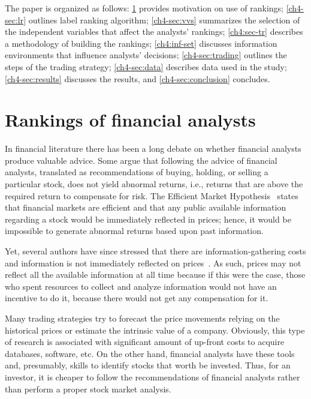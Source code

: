 \documentclass[a4paper,twoside,12pt,openright,notitlepage]{report}\usepackage[]{graphicx}\usepackage[]{color}
\begin{document}
The paper is organized as follows: \ref{ch4-sec:ranking} provides motivation on use of rankings; \ref{ch4-sec:lr} outlines label ranking algorithm; \ref{ch4-sec:vvs} summarizes the selection of the independent variables that affect the analysts' rankings; \ref{ch4:sec-tr} describes a methodology of building the rankings; \ref{ch4:inf-set} discusses information environments that influence analysts' decisions; \ref{ch4-sec:trading} outlines the steps of the trading strategy; \ref{ch4-sec:data} describes data used in the study; \ref{ch4-sec:results} discusses the results, and \ref{ch4-sec:conclusion} concludes.

\section{Rankings of financial  analysts}
\label{ch4-sec:ranking}
In  financial literature there has been a long debate on whether financial analysts produce valuable  advice. Some argue that following the advice of financial analysts,  translated as recommendations of buying, holding, or selling a particular stock, does not yield  abnormal returns, i.e.,  returns that are above the required return to compensate for risk. The Efficient Market Hypothesis~\citep{fama1970ecm} states that financial markets are efficient and that any public available information  regarding a stock would be immediately reflected in prices; hence, it would be  impossible to generate abnormal returns based upon past information.

Yet, several authors have since stressed that  there are information-gathering costs and information is not immediately reflected on prices~\citep{grossman1980iie}. As such, prices may not  reflect all the available information at all time because if this were the case, those who spent resources to collect and analyze   information would not have an incentive to do it, because there would not get any compensation for it.

Many trading strategies try to forecast the price movements relying on the historical prices or estimate the intrinsic value of a company. Obviously, this type of research is associated with significant amount of up-front costs to acquire databases, software, etc. On the other hand, financial analysts have these tools and, presumably, skills to identify  stocks that worth be invested. Thus, for an investor, it is cheaper to follow the recommendations of financial analysts rather than perform a proper stock market analysis.
\end{document}
